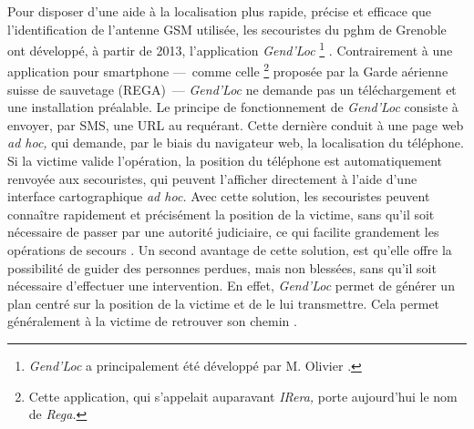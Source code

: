 Pour disposer d'une aide à la localisation plus rapide, précise et
efficace que l'identification de l'antenne GSM utilisée, les
secouristes du \ac{pghm} de Grenoble ont développé, à partir de 2013,
l’application \emph{Gend'Loc} \footnote{\emph{Gend'Loc} a
  principalement été développé par M. Olivier
   \autocite{Muscat2015}.} . Contrairement à une application
pour smartphone ---~comme celle \footnote{Cette application, qui
  s’appelait auparavant \emph{IRera,} porte aujourd'hui le nom de
  \emph{Rega.}}  proposée par la Garde aérienne suisse de sauvetage
(REGA)~--- \emph{Gend'Loc} ne demande pas un téléchargement et une
installation préalable. Le principe de fonctionnement de
\emph{Gend'Loc} consiste à envoyer, par SMS, une URL au
requérant. Cette dernière conduit à une page web \emph{ad hoc,} qui
demande, par le biais du navigateur web, la localisation du
téléphone. Si la victime valide l'opération, la position du téléphone
est automatiquement renvoyée aux secouristes, qui peuvent l'afficher
directement à l'aide d'une interface cartographique \emph{ad hoc.}
Avec cette solution, les secouristes peuvent connaître rapidement et
précisément la position de la victime, sans qu'il soit nécessaire de
passer par une autorité judiciaire, ce qui facilite grandement les
opérations de secours \autocite{Muscat2015}. Un second avantage de
cette solution, est qu'elle offre la possibilité de guider des
personnes perdues, mais non blessées, sans qu'il soit nécessaire
d'effectuer une intervention. En effet, \emph{Gend'Loc} permet de
générer un plan centré sur la position de la victime et de le lui
transmettre. Cela permet généralement à la victime de retrouver son
chemin \autocite{Muscat2015}.

